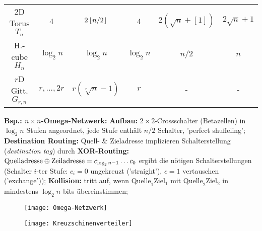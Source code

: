 \documentclass[8pt,a4paper]{article}
\begin{document}
\begin{multicols}{2}
\begin{tabular}{c|ccccc}
2D Torus $T_n$       & 4             & $2\left\lfloor n/2\right\rfloor$           & 4           & $2(\sqrt{n}+[1])$ & 
$2\sqrt{n}+1$                                                                                             \\
H.-cube $H_n$        & $\log_2{n}$   & $\log_2{n}$              & $\log_2{n}$ & $n/2$             & 
$n$                                                                                                       \\
$r$D Gitt. $G_{r,n}$ & $r,\ldots,2r$ & $r(\sqrt[r]{n}-1)$       & $r$         & -                 & -     \\
\end{tabular}
\textbf{Bsp.: $n\times n$-Omega-Netzwerk:} \textbf{Aufbau:} $2\times
2$-Crossschalter (Betazellen) in $\log_2{n}$ Stufen angeordnet, jede
Stufe enthält $n/2$ Schalter, 'perfect shuffeling';
\textbf{Destination Routing:} Quell- \& Zieladresse implizieren
Schalterstellung (\emph{destination tag}) durch \textbf{XOR-Routing:}
$\text{Quelladresse}\oplus\text{Zeiladresse}=c_{\log_2{n}-1}\ldots c_0$ ergibt die nötigen
Schalterstellungen (Schalter $i$-ter Stufe: $c_i=0$ ungekreuzt
('straight'), $c=1$ vertauschen ('exchange')); \textbf{Kollision:}
tritt auf, wenn $\text{Quelle}_1\text{Ziel}_1$ mit
$\text{Quelle}_2\text{Ziel}_2$ in mindestens $\log_2{n}$ bits
übereinstimmen; 

\begin{figure}[H]
\centering
\texttt{[image: Omega-Netzwerk]}
\end{figure}
\begin{figure}[H]
\centering
\texttt{[image: Kreuzschinenverteiler]}
\end{figure}


\end{multicols}
\end{document}
